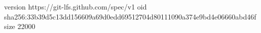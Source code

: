 version https://git-lfs.github.com/spec/v1
oid sha256:33b39d5c13dd156609a69d0edd69512704d80111090a374e9bd4e06660abd46f
size 22000
